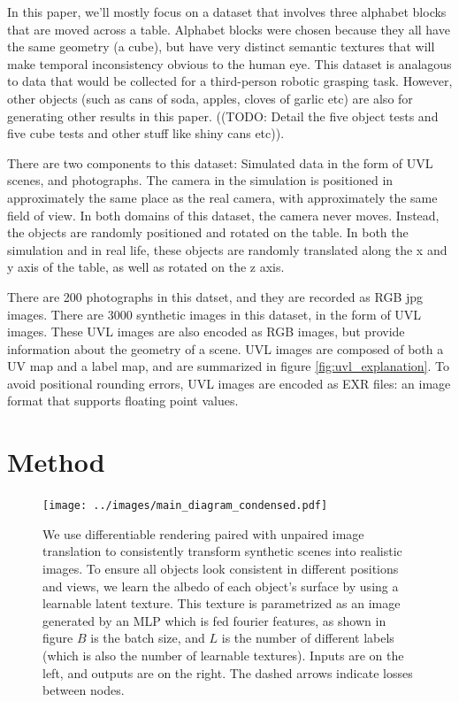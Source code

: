 \documentclass{article}
\begin{document}
In this paper, we'll mostly focus on a dataset that involves three alphabet blocks that are moved across a table.
Alphabet blocks were chosen because they all have the same geometry (a cube), but have very distinct semantic textures that will make temporal inconsistency obvious to the human eye.
This dataset is analagous to data that would be collected for a third-person robotic grasping task.
However, other objects (such as cans of soda, apples, cloves of garlic etc) are also for generating other results in this paper. ((TODO: Detail the five object tests and five cube tests and other stuff like shiny cans etc)).

There are two components to this dataset: Simulated data in the form of UVL scenes, and photographs.
The camera in the simulation is positioned in approximately the same place as the real camera, with approximately the same field of view.
In both domains of this dataset, the camera never moves. Instead, the objects are randomly positioned and rotated on the table.
In both the simulation and in real life, these objects are randomly translated along the x and y axis of the table, as well as rotated on the z axis.

There are 200 photographs in this datset, and they are recorded as RGB jpg images.
There are 3000 synthetic images in this dataset, in the form of UVL images.
These UVL images are also encoded as RGB images, but provide information about the geometry of a scene.
UVL images are composed of both a UV map and a label map, and are summarized in figure \ref{fig:uvl_explanation}.
To avoid positional rounding errors, UVL images are encoded as EXR files: an image format that supports floating point values.


\section{Method}
\label{sec:text}

\begin{figure}[H]
	\begin{center}
		\texttt{[image: ../images/main\_diagram\_condensed.pdf]}
	\end{center}
	\caption{
		We use differentiable rendering paired with unpaired image translation to consistently transform synthetic scenes into realistic images.
		To ensure all objects look consistent in different positions and views, we learn the albedo of each object's surface by using a learnable latent texture.
		This texture is parametrized as an image generated by an MLP which is fed fourier features, as shown in figure 
		$B$ is the batch size, and $L$ is the number of different labels (which is also the number of learnable textures).
		Inputs are on the left, and outputs are on the right.
		The dashed arrows indicate losses between nodes.
	}
	\label{fig:main_diagram}
\end{figure}
\end{document}
